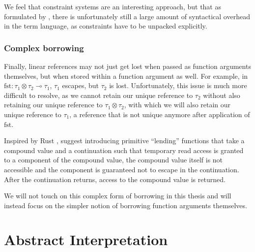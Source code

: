 We feel that constraint systems are an interesting approach, but that as formulated by \cite{spiwack_linearly_2022}, there is unfortunately still a large amount of syntactical overhead in the term language, as constraints have to be unpacked explicitly.

\subsubsection{Complex borrowing}
Finally, linear references may not just get lost when passed as function arguments themselves, but when stored within a function argument as well. For example, in $\mathrm{fst} : \tau_1 \otimes \tau_2 \multimap \tau_1$, $\tau_1$ escapes, but $\tau_2$ is lost. Unfortunately, this issue is much more difficult to resolve, as we cannot retain our unique reference to $\tau_2$ without also retaining our unique reference to $\tau_1 \otimes \tau_2$, with which we will also retain our unique reference to $\tau_1$, a reference that is not unique anymore after application of $\mathrm{fst}$. 

Inspired by Rust \citep{weiss_oxide_2021}, \citep{spiwack_linearly_2022} suggest introducing primitive ``lending'' functions that take a compound value and a continuation such that temporary read access is granted to a component of the compound value, the compound value itself is not accessible and the component is guaranteed not to escape in the continuation. After the continuation returns, access to the compound value is returned. 

We will not touch on this complex form of borrowing in this thesis and will instead focus on the simpler notion of borrowing function arguments themselves.


\section{Abstract Interpretation}